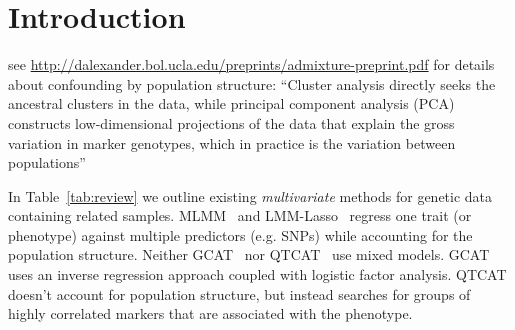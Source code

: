 \documentclass[12pt,letter]{article}\usepackage[]{graphicx}\usepackage[]{color}
\begin{document}

	\section{Introduction}

	see \url{http://dalexander.bol.ucla.edu/preprints/admixture-preprint.pdf} for details about confounding by population structure: ``Cluster analysis directly seeks the ancestral clusters in the data,
	while principal component analysis (PCA) constructs low-dimensional projections of the
	data that explain the gross variation in marker genotypes, which in practice is the variation
	between populations''


	In Table~\ref{tab:review} we outline existing \emph{multivariate} methods for genetic data containing related samples. MLMM~\citep{segura2012efficient} and LMM-Lasso~\citep{rakitsch2013lasso} regress one trait (or phenotype) against multiple predictors (e.g. SNPs) while accounting for the population structure. Neither GCAT~\citep{song2015testing} nor QTCAT~\citep{klasen2016multi} use mixed models. GCAT uses an inverse regression approach coupled with logistic factor analysis. QTCAT doesn't account for population structure, but instead searches for groups of highly correlated markers that are associated with the phenotype.
\end{document}
